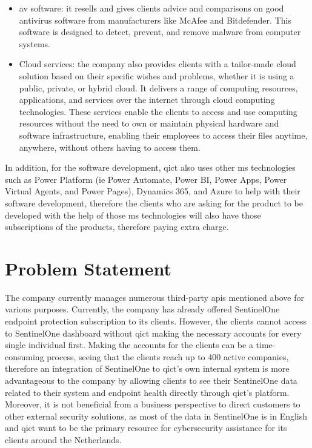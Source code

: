 \begin{itemize}
      \item \acrshort{av} software: it resells and gives clients advice and comparisons on good antivirus software from manufacturers like
            McAfee and Bitdefender. This software is designed to detect, prevent, and remove malware from computer systems.
      \item Cloud services: the company also provides clients with a tailor-made cloud solution based on their specific wishes and
            problems, whether it is using a public, private, or hybrid cloud. It delivers a range of computing resources, applications,
            and services over the internet through cloud computing technologies. These services enable the clients to access and use
            computing resources without the need to own or maintain physical hardware and software infrastructure, enabling their
            employees to access their files anytime, anywhere, without others having to access them.
\end{itemize}

In addition, for the software development, \acrshort{qict} also uses other \acrshort{ms} technologies such as Power Platform
(\acrshort{ie} Power Automate, Power BI, Power Apps, Power Virtual Agents, and Power Pages), Dynamics 365, and Azure to help with their
software development, therefore the clients who are asking for the product to be developed with the help of  those \acrshort{ms}
technologies will also have those subscriptions of the products, therefore paying extra charge.

\section{Problem Statement}
The company currently manages numerous third-party \acrshort{api}s mentioned above for various purposes.
Currently, the company has already offered SentinelOne endpoint protection subscription to its clients.
However, the clients cannot access to SentinelOne dashboard without \acrshort{qict} making the
necessary accounts for every single individual first. Making the accounts for the clients can be a time-consuming process,
seeing that the clients reach up to 400 active companies, therefore an integration of SentinelOne
to \acrshort{qict}'s own internal system is more advantageous to the company by allowing clients to see
their SentinelOne data related to their system and endpoint health directly through \acrshort{qict}'s
platform. Moreover, it is not beneficial from a business perspective to direct customers to other external
security solutions, as most of the data in SentinelOne is in English and \acrshort{qict} want to be the
primary resource for cybersecurity assistance for its clients around the Netherlands.

